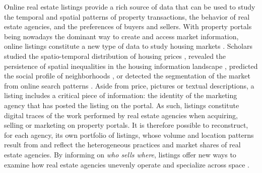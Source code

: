 Online real estate listings provide a rich source of data that can be used to study the temporal and spatial patterns of property transactions, the behavior of real estate agencies, and the preferences of buyers and sellers. With property portals being nowadays the dominant way to create and access market information, online listings constitute a new type of data to study housing markets \cite{sawyer1999ict, boeing2017new, boulay2021moving}. Scholars studied the spatio-temporal distribution of housing prices \cite{yao2018mapping,adolfsen_segmentation_2022}, revealed the persistence of spatial inequalities in the housing information landscape \cite{boeing2020online}, predicted the social profile of neighborhoods \cite{delmelle2021language}, or detected the segmentation of the market from online search patterns \cite{rae2015online}.
Aside from price, pictures or textual descriptions, a listing includes a critical piece of information: the identity of the marketing agency that has posted the listing on the portal. As such, listings constitute digital traces \cite{salganikbit2017} of the work performed by real estate agencies when acquiring, selling or marketing on property portals. It is therefore possible to reconstruct, for each agency, its own portfolio of listings, whose volume and location patterns result from and reflect the heterogeneous practices and market shares of real estate agencies. By informing on \textit{who sells where}, listings offer new ways to examine how real estate agencies unevenly operate and specialize across space \cite{palm1976RealEstate}.


